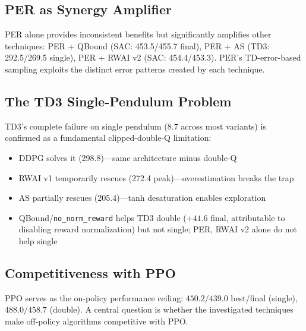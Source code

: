 \documentclass[11pt,a4paper]{article}
\begin{document}
\subsection{PER as Synergy Amplifier}

PER alone provides inconsistent benefits but significantly amplifies other techniques: PER + QBound (SAC: 453.5/455.7 final), PER + AS (TD3: 292.5/269.5 single), PER + RWAI v2 (SAC: 454.4/453.3). PER's TD-error-based sampling exploits the distinct error patterns created by each technique.

\subsection{The TD3 Single-Pendulum Problem}

TD3's complete failure on single pendulum (8.7 across most variants) is confirmed as a fundamental clipped-double-Q limitation:
\begin{itemize}
\item DDPG solves it (298.8)---same architecture minus double-Q
\item RWAI v1 temporarily rescues (272.4 peak)---overestimation breaks the trap
\item AS partially rescues (205.4)---tanh desaturation enables exploration
\item QBound/\texttt{no\_norm\_reward} helps TD3 double ($+41.6$ final, attributable to disabling reward normalization) but not single; PER, RWAI v2 alone do not help single
\end{itemize}

\subsection{Competitiveness with PPO}
\label{sec:ppo_benchmark}

PPO serves as the on-policy performance ceiling: $450.2/439.0$ best/final (single), $488.0/458.7$ (double). A central question is whether the investigated techniques make off-policy algorithms competitive with PPO.
\end{document}
